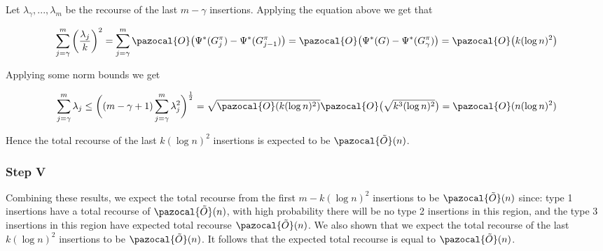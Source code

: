 \documentclass{article}
\begin{document}
Let $\lambda_{\gamma},...,\lambda_{m}$ be the recourse of the last $m - \gamma$ insertions. Applying the equation above we get that

\[\sum_{j=\gamma}^{m}\bigg(\frac{\lambda_{j}}{k}\bigg)^{2} = \sum_{j=\gamma}^{m} \pazocal{O}\big(\Psi^{*}(G_{j}^{\pi}) - \Psi^{*}(G_{j-1}^{\pi})\big) 
= \pazocal{O}\big(\Psi^{*}(G) - \Psi^{*}(G_{\gamma}^{\pi})\big) = \pazocal{O}\big(k (\log n)^2\big)\]

Applying some norm bounds we get

\[\sum_{j=\gamma}^{m}\lambda_{j} \leq \bigg((m-\gamma+1)\sum_{j=\gamma}^{m}\lambda_{j}^{2}\bigg)^{\frac{1}{2}} = \sqrt{\pazocal{O}(k(\log n)^2)}\pazocal{O}\big(\sqrt{k^{3}(\log n)^2}\big) =\pazocal{O}(n(\log n)^2)\]

Hence the total recourse of the last $k(\log n)^2$ insertions is expected to be $\pazocal{\tilde{O}}(n)$.

\subsubsection{Step V}

Combining these results, we expect the total recourse from the first $m-k(\log n)^2$ insertions to be $\pazocal{\tilde{O}}(n)$ since: type 1 insertions have a total recourse of $\pazocal{\tilde{O}}(n)$, with high probability there will be no type 2 insertions in this region, and the type 3 insertions in this region have expected total recourse $\pazocal{\tilde{O}}(n)$. We also shown that we expect the total recourse of the last $k (\log n)^2$ insertions to be $\pazocal{\tilde{O}}(n)$. It follows that the expected total recourse is equal to $\pazocal{\tilde{O}}(n)$.
\end{document}
